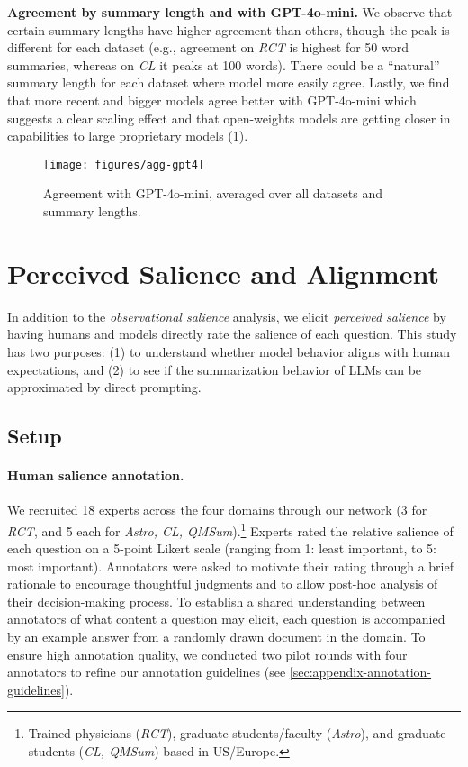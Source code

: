 \textbf{Agreement by summary length and with GPT-4o-mini.}
We observe that certain summary-lengths have higher agreement than others, though the peak is different for each dataset (e.g., agreement on \emph{RCT} is highest for 50 word summaries, whereas on \emph{CL} it peaks at 100 words).
There could be a ``natural'' summary length for each dataset where model more easily agree.
Lastly, we find that more recent and bigger models agree better with GPT-4o-mini which suggests a clear scaling effect and that open-weights models are getting closer in capabilities to large proprietary models (\cref{fig:agg-gpt4}).

\begin{figure}[t]
\texttt{[image: figures/agg-gpt4]}
\caption{Agreement with GPT-4o-mini, averaged over all datasets and summary lengths.}
\label{fig:agg-gpt4}
\end{figure}

\section{Perceived Salience and Alignment}
In addition to the \emph{observational salience} analysis,
we elicit \emph{perceived salience} by having humans and models directly rate the salience of each question.
This study has two purposes: (1) to understand whether model behavior aligns with human expectations, and (2) to see if the summarization behavior of LLMs can be approximated by direct prompting.

\subsection{Setup}
\paragraph{Human salience annotation.}
We recruited 18 experts across the four domains through our network (3 for \emph{RCT}, and 5 each for \emph{Astro, CL, QMSum}).\footnote{
    Trained physicians (\emph{RCT}), graduate students/faculty (\emph{Astro}), and graduate students (\emph{CL, QMSum}) based in US/Europe.
}
Experts rated the relative salience of each question on a 5-point Likert scale (ranging from 1: least important, to 5: most important).
Annotators were asked to motivate their rating through a brief rationale to encourage thoughtful judgments and to allow post-hoc analysis of their decision-making process.
To establish a shared understanding between annotators of what content a question may elicit, each question is accompanied by an example answer from a randomly drawn document in the domain.
To ensure high annotation quality, we conducted two pilot rounds with four annotators to refine our annotation guidelines (see \cref{sec:appendix-annotation-guidelines}).

